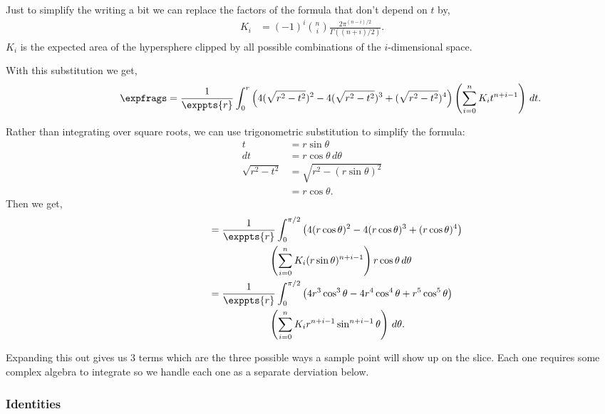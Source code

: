 Just to simplify the writing a bit we can replace the factors of the formula
that don't depend on $t$ by,
\begin{align*}
  K_i &= (-1)^i {n \choose i} \frac{2\pi^{(n-i)/2}}{\Gamma((n+i)/2)}
  \text{.}
\end{align*}
$K_i$ is the expected area of the hypersphere clipped by all possible
combinations of the $i$-dimensional space.  

With this substitution we get,
\begin{align*}
\phantom{\expfrags}
     \expfrags &= \frac{1}{\exppts{r}} \int_0^r 
        \left(4(\sqrt{r^2-t^2})^2 - 4(\sqrt{r^2-t^2})^3 + (\sqrt{r^2-t^2})^4\right) 
        \left(
          \sum_{i=0}^{n} K_i t^{n+i-1}
        \right) \, dt 
        \text{.}
\end{align*}

Rather than integrating over square roots, we can use trigonometric 
substitution to simplify the formula:
\begin{align*}
t  &= r \sin \theta \\
dt &= r \cos \theta \, d\theta \\
\sqrt{r^2 - t^2} &= \sqrt{r^2 - (r\sin \theta)^2} \\
                 &= r \cos \theta 
                 \text{.}
\end{align*}
Then we get,
\begin{align*}
\phantom{\expfrags}
     &= \frac{1}{\exppts{r}} \int_0^{\pi/2}
        \left(4(r\cos \theta)^2 - 4(r\cos \theta)^3 + (r\cos \theta)^4\right) \\
     &\qquad\qquad\qquad
        \left(
          \sum_{i=0}^{n} K_i (r\sin \theta)^{n+i-1} \right) 
        r\cos \theta \, d\theta \\
     &= \frac{1}{\exppts{r}} \int_0^{\pi/2}
        \left(4r^3\cos^3 \theta - 4r^4\cos^4 \theta + r^5\cos^5 \theta\right) \\
     &\qquad\qquad\qquad
        \left(
          \sum_{i=0}^{n} K_i r^{n+i-1}\sin^{n+i-1} \theta 
        \right) \, d\theta
        \text{.}
\end{align*}

Expanding this out gives us 3 terms which are the three possible ways a 
sample point will show up on the slice.  Each one requires some complex
algebra to integrate so we handle each one as a separate derviation below.

\subsubsection{Identities}

